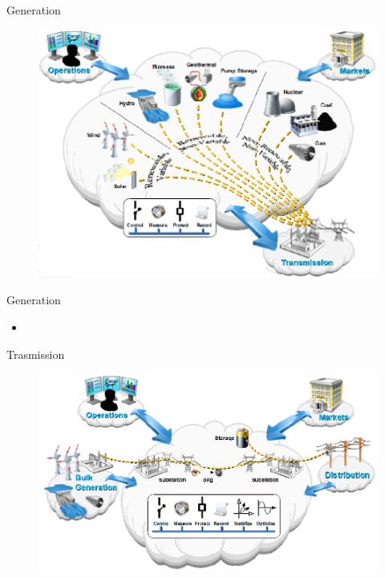 \begin{frame}[fragile]{Generation}
	\begin{figure}[h] 
		\includegraphics[scale=0.45]{imgs/gen.png}
	\end{figure}
\end{frame}

\begin{frame}[fragile]{Generation}
	\begin{itemize}[<+- | alert@+>]
		\item 
	\end{itemize}
\end{frame}


\begin{frame}[fragile]{Trasmission}
	\begin{figure}[h] 
		\includegraphics[scale=0.45]{imgs/tras.png}
	\end{figure}
\end{frame}

